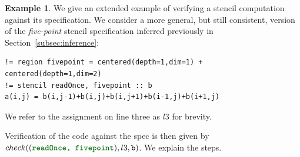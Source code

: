\documentclass[9pt,preprint]{sigplanconf}
\newcounter{block}
\theoremstyle{definition}
\newtheorem{example}[block]{Example}
\newcommand{\interp}[1]{\llbracket{#1}\rrbracket}
\newcommand{\vtwo}[2]{\setlength{\arraycolsep}{0em}
\left[\begin{array}{l}#1\\#2\end{array}\right]}
\begin{document}
\begin{example}
We give an extended example of verifying a stencil computation against
its specification. We consider a more general, but still consistent, version of the \textit{five-point}
stencil specification inferred previously in
Section~\ref{subsec:inference}:
%
\begin{verbatim}
!= region fivepoint = centered(depth=1,dim=1) + centered(depth=1,dim=2)
!= stencil readOnce, fivepoint :: b
a(i,j) = b(i,j-1)+b(i,j)+b(i,j+1)+b(i-1,j)+b(i+1,j)
\end{verbatim}
%
We refer to the assignment on line three as $l3$ for brevity.

Verification of the code against the spec is then given by 
$check(({\textcolor{darkgreen}{\texttt{readOnce, fivepoint}}}),l3,\texttt{b})$. 
We explain the steps.
\end{example}
\end{document}
